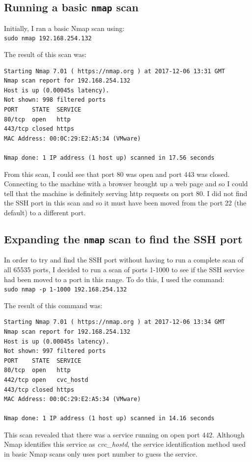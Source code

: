\documentclass[12pt]{report}
\newcommand{\term}[1]{\colorbox{light-gray}{\texttt{#1}}}
\begin{document}
\subsection*{Running a basic \texttt{nmap} scan}
Initially, I ran a basic Nmap scan using:\\
\term{sudo nmap 192.168.254.132}

The result of this scan was:
\begin{Verbatim}[frame=leftline]
Starting Nmap 7.01 ( https://nmap.org ) at 2017-12-06 13:31 GMT
Nmap scan report for 192.168.254.132
Host is up (0.00045s latency).
Not shown: 998 filtered ports
PORT    STATE  SERVICE
80/tcp  open   http
443/tcp closed https
MAC Address: 00:0C:29:E2:A5:34 (VMware)

Nmap done: 1 IP address (1 host up) scanned in 17.56 seconds
\end{Verbatim}

From this scan, I could see that port 80 was open and port 443 was closed. Connecting to the machine with a browser brought up a web page and so I could tell that the machine is definitely serving http requests on port 80. I did not find the SSH port in this scan and so it must have been moved from the port 22 (the default) to a different port.

\subsection*{Expanding the \texttt{nmap} scan to find the SSH port}
In order to try and find the SSH port without having to run a complete scan of all 65535 ports, I decided to run a scan of ports 1-1000 to see if the SSH service had been moved to a port in this range. To do this, I used the command:\\
\term{sudo nmap -p 1-1000 192.168.254.132}

The result of this command was:
\begin{Verbatim}[frame=leftline]
Starting Nmap 7.01 ( https://nmap.org ) at 2017-12-06 13:34 GMT
Nmap scan report for 192.168.254.132
Host is up (0.00045s latency).
Not shown: 997 filtered ports
PORT    STATE  SERVICE
80/tcp  open   http
442/tcp open   cvc_hostd
443/tcp closed https
MAC Address: 00:0C:29:E2:A5:34 (VMware)

Nmap done: 1 IP address (1 host up) scanned in 14.16 seconds
\end{Verbatim}

This scan revealed that there was a service running on open port 442. Although Nmap identifies this service as \textit{cvc\_hostd}, the service identification method used in basic Nmap scans only uses port number to guess the service.
\end{document}
